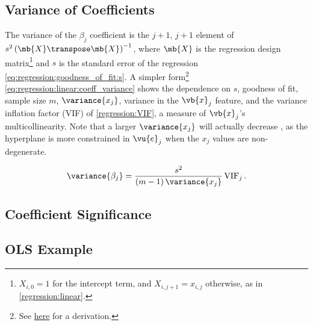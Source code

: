 \subsection{Variance of Coefficients}
\label{regression:linear:coeff_variance}

The variance of the $\beta_{j}$ coefficient
is the $j+1$, $j+1$ element of $s^{2}\left(\mb{X}\transpose \mb{X}\right)^{-1}$,
where $\mb{X}$ is the regression design
matrix\footnote{$X_{i,0} = 1$ for the intercept term, and $X_{i,j+1} = x_{i,j}$ otherwise, as in \cref{regression:linear}.} and
$s$ is the standard error of the regression \cref{eq:regression:goodness_of_fit:s}.
A simpler form\footnote{See \href{https://en.wikipedia.org/wiki/Variance_inflation_factor\#Definition}{here} for a derivation.} \cref{eq:regression:linear:coeff_variance}
shows the dependence on
$s$, \ie goodness of fit,
sample size $m$,
$\variance{x_{j}}$, \ie variance in the $\vb{x}_{j}$ feature,
and the variance inflation factor (VIF) of \cref{regression:VIF}, \ie a measure of $\vb{x}_{j}$'s multicollinearity.
Note that a larger $\variance{x_{j}}$ will actually decrease ,
as the hyperplane is more constrained in $\vu{e}_{j}$ when the $x_{j}$ values are non-degenerate.

\begin{equation}\label{eq:regression:linear:coeff_variance}
\variance{\beta_{j}} = \frac{s^{2}}{\left(m-1\right)\variance{x_{j}}} \, \text{VIF}_{j}\,.
\end{equation}

\subsection{Coefficient Significance}
\label{regression:linear:coeff_significance}

\subsection{OLS Example}
\label{regression:linear:example}

